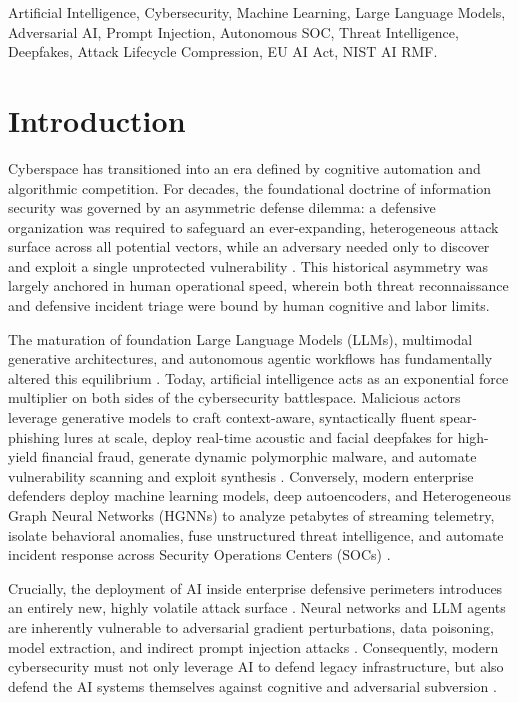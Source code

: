 \documentclass[conference,10pt,twocolumn,a4paper]{IEEEtran}
\begin{document}
\begin{IEEEkeywords}
Artificial Intelligence, Cybersecurity, Machine Learning, Large Language Models, Adversarial AI, Prompt Injection, Autonomous SOC, Threat Intelligence, Deepfakes, Attack Lifecycle Compression, EU AI Act, NIST AI RMF.
\end{IEEEkeywords}

\section{Introduction}
Cyberspace has transitioned into an era defined by cognitive automation and algorithmic competition. For decades, the foundational doctrine of information security was governed by an asymmetric defense dilemma: a defensive organization was required to safeguard an ever-expanding, heterogeneous attack surface across all potential vectors, while an adversary needed only to discover and exploit a single unprotected vulnerability \cite{enisa_etl_2025, greshake2023indirect}. This historical asymmetry was largely anchored in human operational speed, wherein both threat reconnaissance and defensive incident triage were bound by human cognitive and labor limits.

The maturation of foundation Large Language Models (LLMs), multimodal generative architectures, and autonomous agentic workflows has fundamentally altered this equilibrium \cite{enisa_frontier_2026, hines2026securing}. Today, artificial intelligence acts as an exponential force multiplier on both sides of the cybersecurity battlespace. Malicious actors leverage generative models to craft context-aware, syntactically fluent spear-phishing lures at scale, deploy real-time acoustic and facial deepfakes for high-yield financial fraud, generate dynamic polymorphic malware, and automate vulnerability scanning and exploit synthesis \cite{fang2024llm, fang2024teams}. Conversely, modern enterprise defenders deploy machine learning models, deep autoencoders, and Heterogeneous Graph Neural Networks (HGNNs) to analyze petabytes of streaming telemetry, isolate behavioral anomalies, fuse unstructured threat intelligence, and automate incident response across Security Operations Centers (SOCs) \cite{cisa_agentic_ai_2026, mirsky2018kitsune}.

Crucially, the deployment of AI inside enterprise defensive perimeters introduces an entirely new, highly volatile attack surface \cite{nist_sp_ai_100_2e2025}. Neural networks and LLM agents are inherently vulnerable to adversarial gradient perturbations, data poisoning, model extraction, and indirect prompt injection attacks \cite{szegedy2014intriguing, goodfellow2015explaining, carlini2017towards, greshake2023indirect, zou2023universal}. Consequently, modern cybersecurity must not only leverage AI to defend legacy infrastructure, but also defend the AI systems themselves against cognitive and adversarial subversion \cite{cisa_agentic_ai_2026}.
\end{document}
